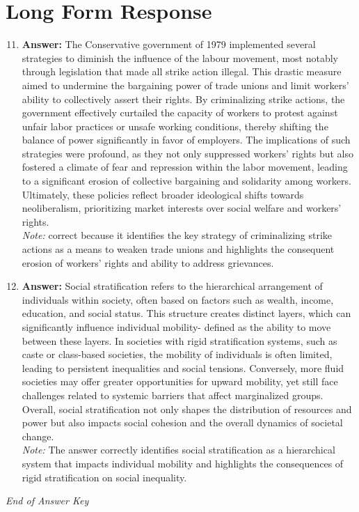 \documentclass[12pt]{article}
\begin{document}
\section*{Long Form Response}
\begin{enumerate}[label=\arabic*.]
\setcounter{enumi}{10}
\item \textbf{Answer:} The Conservative government of 1979 implemented several strategies to diminish the influence of the labour movement, most notably through legislation that made all strike action illegal. This drastic measure aimed to undermine the bargaining power of trade unions and limit workers' ability to collectively assert their rights. By criminalizing strike actions, the government effectively curtailed the capacity of workers to protest against unfair labor practices or unsafe working conditions, thereby shifting the balance of power significantly in favor of employers. The implications of such strategies were profound, as they not only suppressed workers' rights but also fostered a climate of fear and repression within the labor movement, leading to a significant erosion of collective bargaining and solidarity among workers. Ultimately, these policies reflect broader ideological shifts towards neoliberalism, prioritizing market interests over social welfare and workers' rights.
\\ \textit{Note:} correct because it identifies the key strategy of criminalizing strike actions as a means to weaken trade unions and highlights the consequent erosion of workers' rights and ability to address grievances.
\item \textbf{Answer:} Social stratification refers to the hierarchical arrangement of individuals within society, often based on factors such as wealth, income, education, and social status. This structure creates distinct layers, which can significantly influence individual mobility- defined as the ability to move between these layers. In societies with rigid stratification systems, such as caste or class-based societies, the mobility of individuals is often limited, leading to persistent inequalities and social tensions. Conversely, more fluid societies may offer greater opportunities for upward mobility, yet still face challenges related to systemic barriers that affect marginalized groups. Overall, social stratification not only shapes the distribution of resources and power but also impacts social cohesion and the overall dynamics of societal change.
\\ \textit{Note:} The answer correctly identifies social stratification as a hierarchical system that impacts individual mobility and highlights the consequences of rigid stratification on social inequality.
\end{enumerate}

\vfill
\noindent\textit{End of Answer Key}
\end{document}
